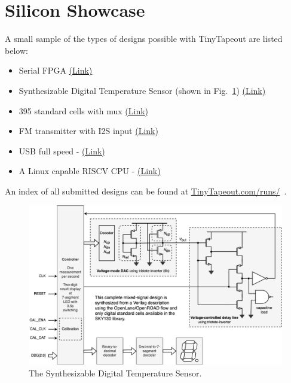 \section{Silicon Showcase}
\label{sec:silicon_showcase}

A small sample of the types of designs possible with TinyTapeout are listed below:

\begin{itemize}
    \item Serial FPGA \href{https://tinytapeout.com/runs/tt02/006/}{(Link)}
    \item Synthesizable Digital Temperature Sensor (shown in Fig.~\ref{fig:synthesizable_digital_temperature_sensor}) \href{https://tinytapeout.com/runs/tt03/047/}{(Link)}
    \item 395 standard cells with mux \href{https://tinytapeout.com/runs/tt03/045/}{(Link)}
    \item FM transmitter with I2S input \href{https://tinytapeout.com/runs/tt04/195/}{(Link)}
    \item USB full speed - \href{https://tinytapeout.com/runs/tt04/054/}{(Link)}
    \item A Linux capable RISCV CPU - \href{https://tinytapeout.com/runs/tt05/654/}{(Link)}
\end{itemize}

An index of all submitted designs can be found at \url{TinyTapeout.com/runs/}~\cite{tinytapeoutruns}.

\begin{figure}[!t]
\centering
\includegraphics[width=\columnwidth]{./Figs/synthesized_temperature_sensor.png}
\caption{The Synthesizable Digital Temperature Sensor.}
\label{fig:synthesizable_digital_temperature_sensor}
\end{figure}
